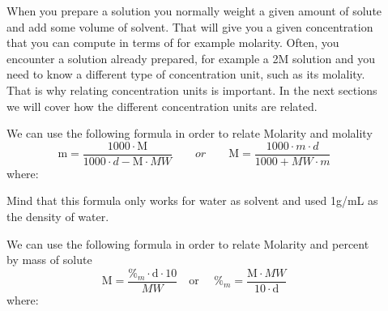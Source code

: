 \documentclass[main.tex]{subfiles}
\newcommand\chapterlabel{Ch-solutions}\setcounter{figurenewcounter}{0}\setcounter{tablenewcounter}{0}\setcounter{formulanewcounter}{0}
\begin{document}
\begin{description}
\item[] 
When you prepare a solution you normally weight a given amount of solute and add some volume of solvent. That will give you a given concentration that you can compute in terms of for example molarity. Often, you encounter a solution already prepared, for example a 2M solution and you need to know a different type of concentration unit, such as its molality. That is why relating concentration units is important. In the next sections we will cover how the different concentration units are related.
\item[] 
We can use the following formula in order to relate Molarity and molality
\begin{equation}
\boxed{ \text{m}=\frac{1000\cdot \text{M}}{1000\cdot d - \text{M}\cdot MW}}
\quad\quad or \quad\quad
\boxed{ \text{M}=\frac{ 1000\cdot m\cdot d   }{1000+MW\cdot m   	}}
\label{\chapterlabel:equation7}
\end{equation}
where:
Mind that this formula only works for water as solvent and used 1g/mL as the density of water.
\item[] 
We can use the following formula in order to relate Molarity and percent by mass of solute
\begin{equation}
\boxed{ \text{M}=\frac{\%_m \cdot \text{d}\cdot 10}{MW}}
\quad  \text{or }\quad 
\boxed{ \%_m=\frac{\text{M}\cdot MW }{10\cdot \text{d} }}
\label{\chapterlabel:equation8}
\end{equation}
where:


\end{description}
\end{document}
